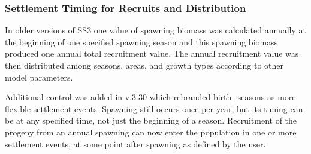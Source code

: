 \hypertarget{SettlementTiming}{}
\subsubsection[Settlement Timing for Recruits and Distribution]{\protect\hyperlink{SettlementTiming}{Settlement Timing for Recruits and Distribution}}
In older versions of SS3 one value of spawning biomass was calculated annually at the beginning of one specified spawning season and this spawning biomass produced one annual total recruitment value. The annual recruitment value was then distributed among seasons, areas, and growth types according to other model parameters.

Additional control was added in v.3.30 which rebranded birth\_seasons as more flexible settlement events. Spawning still occurs once per year, but its timing can be at any specified time, not just the beginning of a season. Recruitment of the progeny from an annual spawning can now enter the population in one or more settlement events, at some point after spawning as defined by the user.

